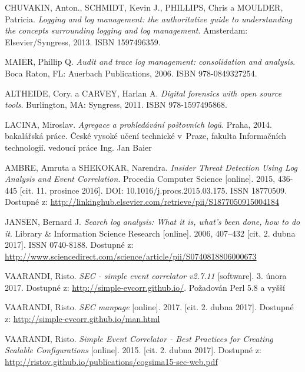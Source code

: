 \documentclass[thesis=B,czech]{FITthesis}[2012/06/26]
\begin{document}

\begin{thebibliography}{9}
	
	CHUVAKIN, Anton., SCHMIDT, Kevin J., PHILLIPS, Chris a MOULDER, Patricia. \textit{Logging and log management: the authoritative guide to understanding the concepts surrounding logging and log management}. Amsterdam: Elsevier/Syngress, 2013. ISBN 1597496359.
			
	MAIER, Phillip Q. \textit{Audit and trace log management: consolidation and analysis}. Boca Raton, FL: Auerbach Publications, 2006. ISBN 978-0849327254.			
	
	ALTHEIDE, Cory. a CARVEY, Harlan A. \textit{Digital forensics with open source tools}. Burlington, MA: Syngress, 2011. ISBN 978-1597495868.
			
	LACINA, Miroslav. \textit{Agregace a prohledávání poštovních logů}. Praha, 2014. bakalářská práce. České vysoké učení technické v~Praze, fakulta Informačních technologií. vedoucí práce Ing. Jan Baier 

	AMBRE, Amruta a SHEKOKAR, Narendra. \textit{Insider Threat Detection Using Log Analysis and Event Correlation}. Procedia Computer Science [online]. 2015, 436-445 [cit. 11. prosince 2016]. DOI: 10.1016/j.procs.2015.03.175. ISSN 18770509. Dostupné z: \url{http://linkinghub.elsevier.com/retrieve/pii/S1877050915004184}
	
	JANSEN, Bernard J. \textit{Search log analysis: What it is, what's been done, how to do it}. Library \& Information Science Research [online].  2006, 407–432 [cit. 2. dubna 2017]. ISSN 0740-8188. Dostupné z: \url{http://www.sciencedirect.com/science/article/pii/S0740818806000673}
	
	VAARANDI, Risto. \textit{SEC - simple event correlator v2.7.11} [software].  3. února 2017. Dostupné z: \url{http://simple-evcorr.github.io/}. Požadován Perl 5.8 a vyšší
	
	VAARANDI, Risto. \textit{SEC manpage} [online]. 2017. [cit. 2. dubna 2017]. Dostupné z: \url{http://simple-evcorr.github.io/man.html}
	
	VAARANDI, Risto. \textit{Simple Event Correlator - Best Practices for Creating Scalable Configurations} [online]. 2015. [cit. 2. dubna 2017]. Dostupné z: \url{http://ristov.github.io/publications/cogsima15-sec-web.pdf}
	

\end{thebibliography}
\end{document}
